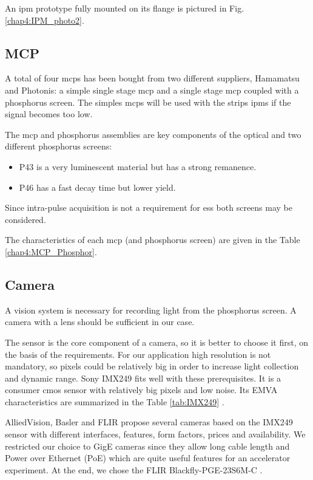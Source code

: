 \begin{refsection}
  An \acrshort{ipm} prototype fully mounted on its flange is pictured in Fig. \ref{chap4:IPM_photo2}.

  \subsection{MCP}
  A total of four \acrshort{mcp}s has been bought from two different suppliers, Hamamatsu and Photonis: a simple single stage \acrshort{mcp} and a single stage \acrshort{mcp} coupled with a phosphorus screen. The simples \acrshort{mcp}s will be used with the strips \acrshort{ipm}s if the signal becomes too low.

  The \acrshort{mcp} and phosphorus assemblies are key components of the optical and two different phosphorus screens:
  \begin{itemize}
    \item P43 is a very luminescent material but has a strong remanence.
    \item P46 has a fast decay time but lower yield.
  \end{itemize}
  Since intra-pulse acquisition is not a requirement for \acrshort{ess} both screens may be considered.

  The characteristics of each \acrshort{mcp} (and phosphorus screen) are given in the Table \ref{chap4:MCP_Phosphor}.
  

  \subsection{Camera}
  A vision system is necessary for recording light from the phosphorus screen.
  A camera with a lens should be sufficient in our case.

  The sensor is the core component of a camera, so it is better to choose it first, on the basis of the requirements.
  For our application high resolution is not mandatory, so pixels could be relatively big in order to increase light collection and dynamic range.
  Sony IMX249 fits well with these prerequisites. It is a consumer \acrshort{cmos} sensor with relatively big pixels and low noise.
  Its EMVA characteristics are summarized in the Table \ref{tab:IMX249} \cite{emva2010}.
  

  AlliedVision, Basler and FLIR propose several cameras based on the IMX249 sensor with different interfaces, features, form factors, prices and availability.
  We restricted our choice to GigE cameras since they allow long cable length and Power over Ethernet (PoE) which are quite useful features for an accelerator experiment.
  At the end, we chose the FLIR Blackfly-PGE-23S6M-C \cite{blackfly2019}.


\end{refsection}
